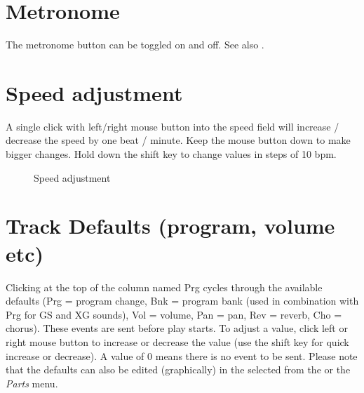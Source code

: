 \documentclass[letterpaper]{report}
\begin{document}
\section{Metronome}\label{metro}

The metronome button can be toggled on and off.
See also .

\section{Speed adjustment}\label{speed}

A single click with left/right mouse button into the speed field will
increase / decrease the speed by one beat / minute. Keep the mouse button
down to make bigger changes. Hold down the shift key to change
values in steps of 10 bpm.

\begin{figure}
\caption{Speed adjustment}
\end{figure}


\section{Track Defaults (program, volume etc)}\label{trackdefs}

Clicking at the top of the column named Prg cycles through the available
defaults (Prg = program change, Bnk = program bank (used in combination
with Prg for GS and XG sounds), Vol = volume, Pan = pan, Rev = reverb,
Cho = chorus). These events are sent before play starts. To adjust a
value, click left or right mouse button to increase or decrease the
value (use the shift key for quick increase or decrease). A value of 0
means there is no event to be sent. Please note that the defaults can also be
edited (graphically) in the  selected from the
 or the {\em Parts} menu.
\end{document}
